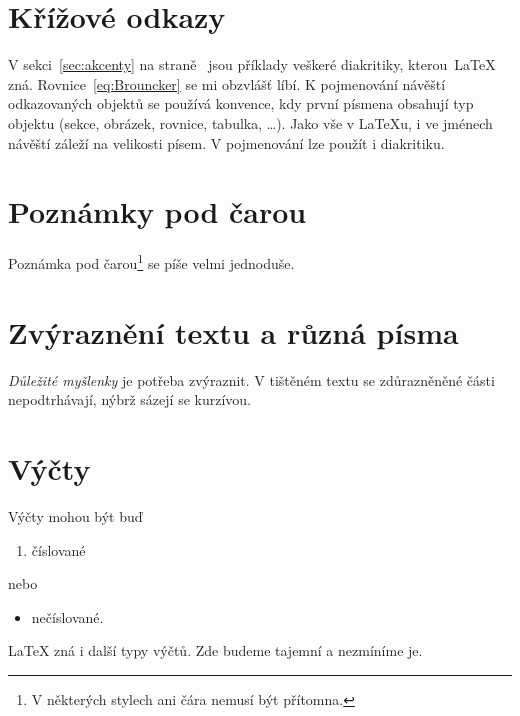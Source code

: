 \documentclass{article}
\begin{document}
	\section{Křížové odkazy}
	V sekci~\ref{sec:akcenty} na straně~\pageref{sec:akcenty} jsou příklady veškeré diakritiky, kterou~\LaTeX{} zná.
	Rovnice~\eqref{eq:Brouncker} se mi obzvlášť líbí.
	K pojmenování návěští odkazovaných objektů se používá konvence, kdy první písmena obsahují typ objektu (sekce, obrázek, rovnice, tabulka, \ldots).
	Jako vše v \LaTeX{}u, i ve jménech návěští záleží na velikosti písem.
	V pojmenování lze použít i diakritiku.
	
	\section{Poznámky pod čarou}
	Poznámka pod čarou\footnote{V některých stylech ani čára nemusí být přítomna.} se píše velmi jednoduše.

	\section{Zvýraznění textu a různá písma}
	\emph{Důležité myšlenky} je potřeba zvýraznit.
	V tištěném textu se zdůrazněněné části nepodtrhávají, nýbrž sázejí se kurzívou.
	
	\section{Výčty}
	Výčty mohou být buď
	\begin{enumerate}
		\item číslované
	\end{enumerate}
	nebo
	\begin{itemize}
		\item nečíslované.
	\end{itemize}
	\LaTeX{} zná i další typy výčtů.
	Zde budeme tajemní a nezmíníme je.	
\end{document}
